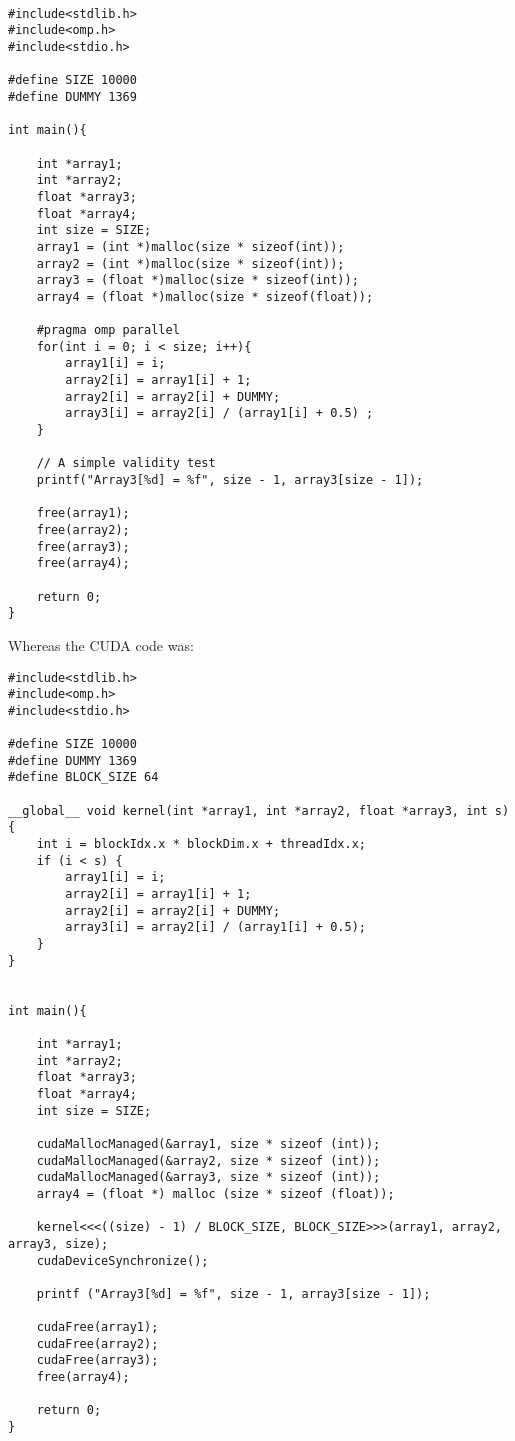 \documentclass{article}
\begin{document}
\begin{lstlisting}

#include<stdlib.h>
#include<omp.h>
#include<stdio.h>

#define SIZE 10000
#define DUMMY 1369

int main(){

	int *array1;
	int *array2;
	float *array3;
	float *array4;
	int size = SIZE;
	array1 = (int *)malloc(size * sizeof(int));
	array2 = (int *)malloc(size * sizeof(int));
	array3 = (float *)malloc(size * sizeof(int));
	array4 = (float *)malloc(size * sizeof(float));
	
	#pragma omp parallel
	for(int i = 0; i < size; i++){
		array1[i] = i;
        array2[i] = array1[i] + 1;
        array2[i] = array2[i] + DUMMY;
		array3[i] = array2[i] / (array1[i] + 0.5) ;
	}

	// A simple validity test
	printf("Array3[%d] = %f", size - 1, array3[size - 1]);

	free(array1);
    free(array2);
    free(array3);
	free(array4);

	return 0;
}

\end{lstlisting}

Whereas the CUDA code was:

\begin{lstlisting}
#include<stdlib.h>
#include<omp.h>
#include<stdio.h>

#define SIZE 10000
#define DUMMY 1369
#define BLOCK_SIZE 64

__global__ void kernel(int *array1, int *array2, float *array3, int s) {
    int i = blockIdx.x * blockDim.x + threadIdx.x;
    if (i < s) {
        array1[i] = i;
        array2[i] = array1[i] + 1;
        array2[i] = array2[i] + DUMMY;
        array3[i] = array2[i] / (array1[i] + 0.5);
    }
}


int main(){

	int *array1;
    int *array2;
    float *array3;
    float *array4;
    int size = SIZE;
	
    cudaMallocManaged(&array1, size * sizeof (int));
    cudaMallocManaged(&array2, size * sizeof (int));
    cudaMallocManaged(&array3, size * sizeof (int));
    array4 = (float *) malloc (size * sizeof (float));
	
    kernel<<<((size) - 1) / BLOCK_SIZE, BLOCK_SIZE>>>(array1, array2, array3, size);
    cudaDeviceSynchronize();
	
    printf ("Array3[%d] = %f", size - 1, array3[size - 1]);
    
	cudaFree(array1);
    cudaFree(array2);
    cudaFree(array3);
    free(array4);
    
	return 0;
}
\end{lstlisting}
\end{document}
